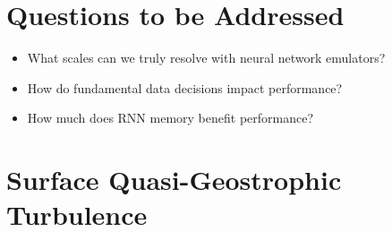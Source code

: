 \section{Questions to be Addressed}
\begin{itemize}
    \item What scales can we truly resolve with neural network emulators?
    \item How do fundamental data decisions impact performance?
    \item How much does RNN memory benefit performance?
\end{itemize}

\section{Surface Quasi-Geostrophic Turbulence}

